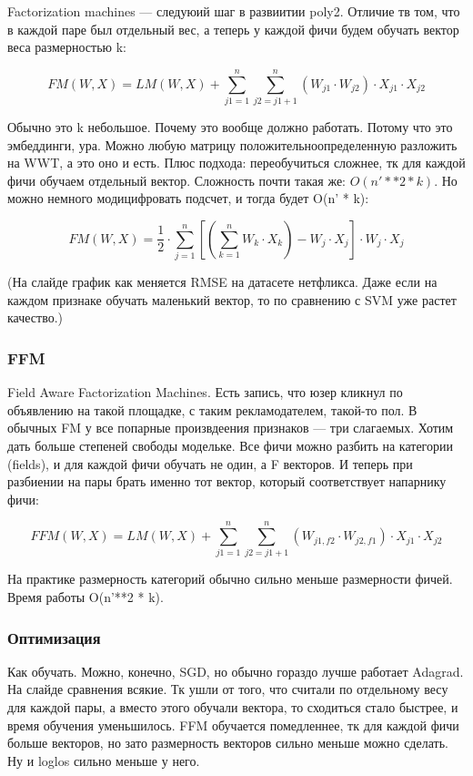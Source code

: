 \documentclass[12pt]{article}
\begin{document}
Factorization machines --- следуюий шаг в развиитии poly2. Отличие тв том, что в каждой паре был отдельный вес, а теперь у каждой фичи будем обучать вектор веса размерностью k:

$$ FM(W, X) = LM(W, X) + \sum_{j1=1}^{n} {\sum_{j2=j1+1}^{n} (W_{j1} \cdot W_{j2})\cdot X_{j1} \cdot X_{j2}} $$

Обычно это k небольшое. Почему это вообще должно работать. Потому что это эмбеддинги, ура. Можно любую матрицу положительноопределенную разложить на WWT, а это оно и есть. Плюс подхода: переобучиться сложнее, тк для каждой фичи обучаем отдельный вектор. Сложность почти такая же: $O(n'**2 * k)$. Но можно немного модицифровать подсчет, и тогда будет O(n' * k):

$$ FM(W, X) = \frac{1}{2} \cdot \sum_{j=1}^{n} {[(\sum_{k=1}^{n} {W_k\cdot X_k}) - W_j\cdot X_j] \cdot W_j\cdot X_j} $$

(На слайде график как меняется RMSE на датасете нетфликса. Даже если на каждом признаке обучать маленький вектор, то по сравнению с SVM уже растет качество.)

\subsubsection{FFM} 

Field Aware Factorization Machines. Есть запись, что юзер кликнул по объявлению на такой площадке, с таким рекламодателем, такой-то пол. В обычных FM у все попарные произвдеения признаков --- три слагаемых. Хотим дать больше степеней свободы модельке. Все фичи можно разбить на категории (fields), и для каждой фичи обучать не один, а F векторов. И теперь при разбиении на пары брать именно тот вектор, который соответствует напарнику фичи:

$$ FFM(W, X) = LM(W, X) + \sum_{j1=1}^{n} {\sum_{j2=j1+1}^{n} (W_{j1,f2} \cdot W_{j2,f1})\cdot X_{j1} \cdot X_{j2}} $$

На практике размерность категорий обычно сильно меньше размерности фичей. Время работы O(n'**2 * k).

\subsubsection{Оптимизация} 

Как обучать. Можно, конечно, SGD, но обычно гораздо лучше работает Adagrad. На слайде сравнения всякие. Тк ушли от того, что считали по отдельному весу для каждой пары, а вместо этого обучали вектора, то сходиться стало быстрее, и время обучения уменьшилось. FFM обучается помедленнее, тк для каждой фичи больше векторов, но зато размерность векторов сильно меньше можно сделать. Ну и loglos сильно меньше у него.
\end{document}
